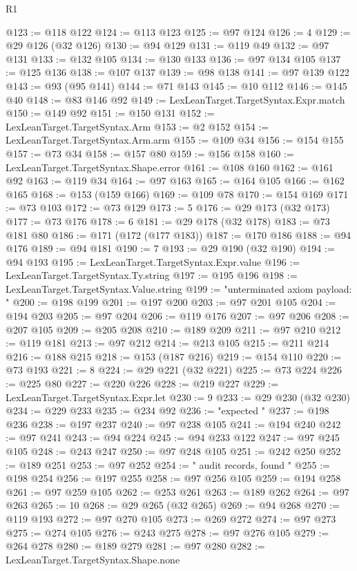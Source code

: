 \begin{lexlean}{R1}
\begin{coremodule}
{{{{{{{{{{{{{{{{{{{{{{{{{{{{{{{{{{{{{{{{{{{{{{{{{{{{{{{{{{{{{{{{{{{{{{{{{{{{{{{{{{{{{{{{{{{{{{{{{{{{{{{{{{{{{{{{{{{{{{{{{{{{{{{{{{{{{{{{{{{{{{{{{{{{{{{{{{{{{{{{{{{{{{{{{{{{{{{{{{{{{{{{{{@123 := @118 @122
@124 := @113 @123
@125 := @97 @124
@126 := 4
@129 := @29 @126 (@32 @126)
@130 := @94 @129
@131 := @119 @49
@132 := @97 @131
@133 := @132 @105
@134 := @130 @133
@136 := @97 @134 @105
@137 := @125 @136
@138 := @107 @137
@139 := @98 @138
@141 := @97 @139 @122
@143 := @93 (@95 @141)
@144 := @71 @143
@145 := @10 @112
@146 := @145 @40
@148 := @83 @146 @92
@149 := LexLeanTarget.TargetSyntax.Expr.match
@150 := @149 @92
@151 := @150 @131
@152 := LexLeanTarget.TargetSyntax.Arm
@153 := @2 @152
@154 := LexLeanTarget.TargetSyntax.Arm.arm
@155 := @109 @34
@156 := @154 @155
@157 := @73 @34
@158 := @157 @80
@159 := @156 @158
@160 := LexLeanTarget.TargetSyntax.Shape.error
@161 := @108 @160
@162 := @161 @92
@163 := @119 @34
@164 := @97 @163
@165 := @164 @105
@166 := @162 @165
@168 := @153 (@159 @166)
@169 := @109 @78
@170 := @154 @169
@171 := @73 @103
@172 := @73 @129
@173 := 5
@176 := @29 @173 (@32 @173)
@177 := @73 @176
@178 := 6
@181 := @29 @178 (@32 @178)
@183 := @73 @181 @80
@186 := @171 (@172 (@177 @183))
@187 := @170 @186
@188 := @94 @176
@189 := @94 @181
@190 := 7
@193 := @29 @190 (@32 @190)
@194 := @94 @193
@195 := LexLeanTarget.TargetSyntax.Expr.value
@196 := LexLeanTarget.TargetSyntax.Ty.string
@197 := @195 @196
@198 := LexLeanTarget.TargetSyntax.Value.string
@199 := "unterminated axiom payload: "
@200 := @198 @199
@201 := @197 @200
@203 := @97 @201 @105
@204 := @194 @203
@205 := @97 @204
@206 := @119 @176
@207 := @97 @206
@208 := @207 @105
@209 := @205 @208
@210 := @189 @209
@211 := @97 @210
@212 := @119 @181
@213 := @97 @212
@214 := @213 @105
@215 := @211 @214
@216 := @188 @215
@218 := @153 (@187 @216)
@219 := @154 @110
@220 := @73 @193
@221 := 8
@224 := @29 @221 (@32 @221)
@225 := @73 @224
@226 := @225 @80
@227 := @220 @226
@228 := @219 @227
@229 := LexLeanTarget.TargetSyntax.Expr.let
@230 := 9
@233 := @29 @230 (@32 @230)
@234 := @229 @233
@235 := @234 @92
@236 := "expected "
@237 := @198 @236
@238 := @197 @237
@240 := @97 @238 @105
@241 := @194 @240
@242 := @97 @241
@243 := @94 @224
@245 := @94 @233 @122
@247 := @97 @245 @105
@248 := @243 @247
@250 := @97 @248 @105
@251 := @242 @250
@252 := @189 @251
@253 := @97 @252
@254 := " audit records, found "
@255 := @198 @254
@256 := @197 @255
@258 := @97 @256 @105
@259 := @194 @258
@261 := @97 @259 @105
@262 := @253 @261
@263 := @189 @262
@264 := @97 @263
@265 := 10
@268 := @29 @265 (@32 @265)
@269 := @94 @268
@270 := @119 @193
@272 := @97 @270 @105
@273 := @269 @272
@274 := @97 @273
@275 := @274 @105
@276 := @243 @275
@278 := @97 @276 @105
@279 := @264 @278
@280 := @189 @279
@281 := @97 @280
@282 := LexLeanTarget.TargetSyntax.Shape.none
}}}}}}}}}}}}}}}}}}}}}}}}}}}}}}}}}}}}}}}}}}}}}}}}}}}}}}}}}}}}}}}}}}}}}}}}}}}}}}}}}}}}}}}}}}}}}}}}}}}}}}}}}}}}}}}}}}}}}}}}}}}}}}}}}}}}}}}}}}}}}}}}}}}}}}}}}}}}}}}}}}}}}}}}}}}}}}}}}}}}}}}}}}
\end{coremodule}
\end{lexlean}

